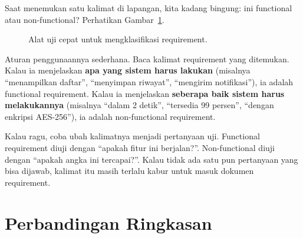 \documentclass[11pt,a4paper]{article}
\begin{document}
Saat menemukan satu kalimat di lapangan, kita kadang bingung: ini functional atau non-functional? Perhatikan Gambar~\ref{fig:decision}.

\begin{figure}[H]
	\centering
	\caption{Alat uji cepat untuk mengklasifikasi requirement.}
	\label{fig:decision}
\end{figure}

Aturan penggunaannya sederhana. Baca kalimat requirement yang ditemukan. Kalau ia menjelaskan \textbf{apa yang sistem harus lakukan} (misalnya ``menampilkan daftar'', ``menyimpan riwayat'', ``mengirim notifikasi''), ia adalah functional requirement. Kalau ia menjelaskan \textbf{seberapa baik sistem harus melakukannya} (misalnya ``dalam 2 detik'', ``tersedia 99 persen'', ``dengan enkripsi AES-256''), ia adalah non-functional requirement.

Kalau ragu, coba ubah kalimatnya menjadi pertanyaan uji. Functional requirement diuji dengan ``apakah fitur ini berjalan?''. Non-functional diuji dengan ``apakah angka ini tercapai?''. Kalau tidak ada satu pun pertanyaan yang bisa dijawab, kalimat itu masih terlalu kabur untuk masuk dokumen requirement.

\section{Perbandingan Ringkasan}
\end{document}
